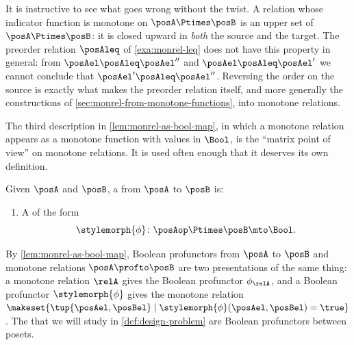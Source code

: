 \begin{remark}
    It is instructive to see what goes wrong without the twist.
    A relation whose indicator function is monotone on $\posA \Ptimes \posB$ is an upper set of $\posA \Ptimes \posB$: it is closed upward in \emph{both} the source and the target.
    The preorder relation $\posAleq$ of \cref{exa:monrel-leq} does not have this property in general: from $\posAel \posAleq \posAel''$ and $\posAel \posAleq \posAel'$ we cannot conclude that $\posAel' \posAleq \posAel''$.
    Reversing the order on the source is exactly what makes the preorder relation itself, and more generally the constructions of \cref{sec:monrel-from-monotone-functions}, into monotone relations.
\end{remark}

The third description in \cref{lem:monrel-as-bool-map}, in which a monotone relation appears as a monotone function with values in $\Bool$, is the ``matrix point of view'' on monotone relations.
It is used often enough that it deserves its own definition.

\begin{ctdefinition}
    \label{def:boolean-profunctor}
    Given  $\posA$ and $\posB$, a  from $\posA$ to $\posB$ is:

    \constit
    \begin{enumerate}
        \item A  of the form
              \begin{equation}
                  \label{eq:boolean-profunctor-as-monfun}
                  \stylemorph{\phi} \colon \posAop \Ptimes \posB \mto \Bool.
              \end{equation}
    \end{enumerate}
\end{ctdefinition}

By \cref{lem:monrel-as-bool-map}, Boolean profunctors from $\posA$ to $\posB$ and monotone relations $\posA \profto \posB$ are two presentations of the same thing: a monotone relation $\relA$ gives the Boolean profunctor $\phi_\relA$, and a Boolean profunctor $\stylemorph{\phi}$ gives the monotone relation $\makeset{\tup{\posAel, \posBel} \mid \stylemorph{\phi}(\posAel, \posBel) = \true}$.
The  that we will study in \cref{def:design-problem} are Boolean profunctors between posets.

